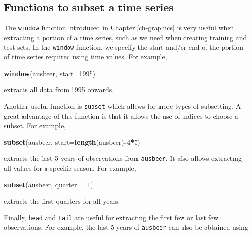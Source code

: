 \documentclass[]{book}
\newenvironment{Shaded}{\begin{snugshade}}{\end{snugshade}}
\newcommand{\DataTypeTok}[1]{\textcolor[rgb]{0.13,0.29,0.53}{#1}}
\newcommand{\DecValTok}[1]{\textcolor[rgb]{0.00,0.00,0.81}{#1}}
\newcommand{\KeywordTok}[1]{\textcolor[rgb]{0.13,0.29,0.53}{\textbf{#1}}}
\newcommand{\NormalTok}[1]{#1}
\newcommand{\OperatorTok}[1]{\textcolor[rgb]{0.81,0.36,0.00}{\textbf{#1}}}
\begin{document}
\hypertarget{functions-to-subset-a-time-series}{%
\subsection*{Functions to subset a time series}\label{functions-to-subset-a-time-series}}

The \texttt{window} function introduced in Chapter \ref{ch-graphics} is very useful when extracting a portion of a time series, such as we need when creating training and test sets. In the \texttt{window} function, we specify the start and/or end of the portion of time series required using time values. For example,

\begin{Shaded}
\begin{Highlighting}[]
\KeywordTok{window}\NormalTok{(ausbeer, }\DataTypeTok{start=}\DecValTok{1995}\NormalTok{)}
\end{Highlighting}
\end{Shaded}

extracts all data from 1995 onwards.

Another useful function is \texttt{subset} which allows for more types of subsetting. A great advantage of this function is that it allows the use of indices to choose a subset. For example,

\begin{Shaded}
\begin{Highlighting}[]
\KeywordTok{subset}\NormalTok{(ausbeer, }\DataTypeTok{start=}\KeywordTok{length}\NormalTok{(ausbeer)}\OperatorTok{-}\DecValTok{4}\OperatorTok{*}\DecValTok{5}\NormalTok{)}
\end{Highlighting}
\end{Shaded}

extracts the last 5 years of observations from \texttt{ausbeer}. It also allows extracting all values for a specific season. For example,

\begin{Shaded}
\begin{Highlighting}[]
\KeywordTok{subset}\NormalTok{(ausbeer, }\DataTypeTok{quarter =} \DecValTok{1}\NormalTok{)}
\end{Highlighting}
\end{Shaded}

extracts the first quarters for all years.

Finally, \texttt{head} and \texttt{tail} are useful for extracting the first few or last few observations. For example, the last 5 years of \texttt{ausbeer} can also be obtained using
\end{document}
